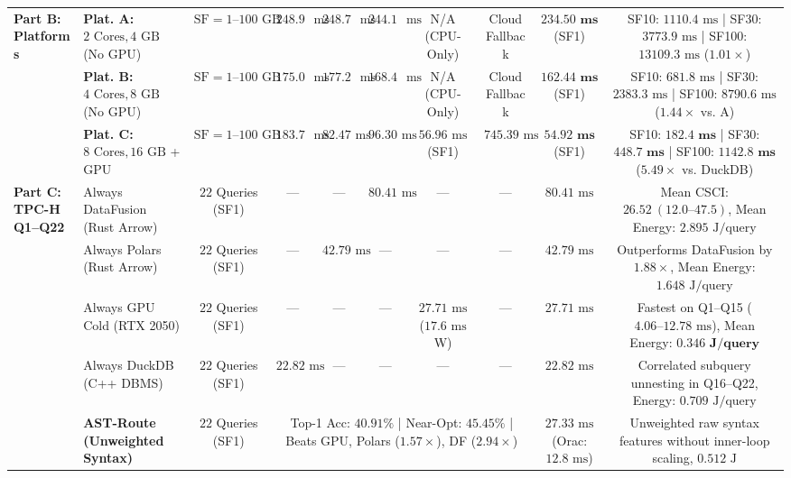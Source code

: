\documentclass[10pt,a4paper]{article}
\begin{document}
\begin{table}[t!]
{\begin{tabular}{@{}llcccccccc@{}}
\multirow{3}{*}{\textbf{Part B: Platforms}}
 & \textbf{Plat. A:} $2\text{ Cores}, 4\text{ GB}$ (No GPU) & $\text{SF}=1\text{--}100\text{ GB}$ & $248.99\text{ ms}$ & $248.74\text{ ms}$ & $244.12\text{ ms}$ & N/A (CPU-Only) & Cloud Fallback & $\mathbf{234.50\text{ ms}}$ (SF1) & SF10: $1110.4\text{ ms}$ | SF30: $3773.9\text{ ms}$ | SF100: $13109.3\text{ ms}$ ($1.01\times$) \\
 & \textbf{Plat. B:} $4\text{ Cores}, 8\text{ GB}$ (No GPU) & $\text{SF}=1\text{--}100\text{ GB}$ & $175.00\text{ ms}$ & $177.28\text{ ms}$ & $168.45\text{ ms}$ & N/A (CPU-Only) & Cloud Fallback & $\mathbf{162.44\text{ ms}}$ (SF1) & SF10: $681.8\text{ ms}$ | SF30: $2383.3\text{ ms}$ | SF100: $8790.6\text{ ms}$ ($\mathbf{1.44\times}$ vs. A) \\
 & \textbf{Plat. C:} $8\text{ Cores}, 16\text{ GB}$ + GPU & $\text{SF}=1\text{--}100\text{ GB}$ & $183.74\text{ ms}$ & $82.47\text{ ms}$ & $96.30\text{ ms}$ & $56.96\text{ ms}$ (SF1) & $745.39\text{ ms}$ & $\mathbf{54.92\text{ ms}}$ (SF1) & SF10: $\mathbf{182.4\text{ ms}}$ | SF30: $\mathbf{448.7\text{ ms}}$ | SF100: $\mathbf{1142.8\text{ ms}}$ ($\mathbf{5.49\times}$ vs. DuckDB) \\
\midrule
\multirow{6}{*}{\textbf{Part C: TPC-H Q1--Q22}}
 & Always DataFusion (Rust Arrow) & $22$ Queries (SF1) & --- & --- & $80.41\text{ ms}$ & --- & --- & $80.41\text{ ms}$ & Mean CSCI: $26.52\ (12.0\text{--}47.5)$, Mean Energy: $2.895\text{ J/query}$ \\
 & Always Polars (Rust Arrow) & $22$ Queries (SF1) & --- & $42.79\text{ ms}$ & --- & --- & --- & $42.79\text{ ms}$ & Outperforms DataFusion by $1.88\times$, Mean Energy: $1.648\text{ J/query}$ \\
 & Always GPU Cold (RTX 2050) & $22$ Queries (SF1) & --- & --- & --- & $27.71\text{ ms}$ ($17.6\text{ ms}$ W) & --- & $27.71\text{ ms}$ & Fastest on Q1--Q15 ($4.06\text{--}12.78\text{ ms}$), Mean Energy: $\mathbf{0.346\text{ J/query}}$ \\
 & Always DuckDB (C++ DBMS) & $22$ Queries (SF1) & $22.82\text{ ms}$ & --- & --- & --- & --- & $22.82\text{ ms}$ & Correlated subquery unnesting in Q16--Q22, Energy: $0.709\text{ J/query}$ \\
 & \textbf{AST-Route (Unweighted Syntax)} & $22$ Queries (SF1) & \multicolumn{5}{c}{Top-1 Acc: $40.91\%$ | Near-Opt: $45.45\%$ | Beats GPU, Polars ($1.57\times$), DF ($2.94\times$)} & $27.33\text{ ms}$ (Orac: $12.8\text{ ms}$) & Unweighted raw syntax features without inner-loop scaling, $0.512\text{ J}$ \\

\end{tabular}}
\end{table}
\end{document}
